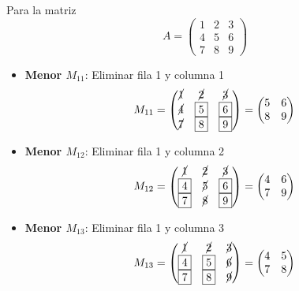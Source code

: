 \begin{example}
Para la matriz 
\[
A = \begin{pmatrix}
1 & 2 & 3 \\
4 & 5 & 6 \\
7 & 8 & 9
\end{pmatrix}
\]

\begin{itemize}
\item \textbf{Menor $M_{11}$}: Eliminar fila 1 y columna 1
\[
M_{11} = \begin{pmatrix}
\cancel{1} & \cancel{2} & \cancel{3} \\
\cancel{4} & \boxed{5} & \boxed{6} \\
\cancel{7} & \boxed{8} & \boxed{9}
\end{pmatrix}
= \begin{pmatrix} 5 & 6 \\ 8 & 9 \end{pmatrix}
\]

\item \textbf{Menor $M_{12}$}: Eliminar fila 1 y columna 2
\[
M_{12} = \begin{pmatrix}
\cancel{1} & \cancel{2} & \cancel{3} \\
\boxed{4} & \cancel{5} & \boxed{6} \\
\boxed{7} & \cancel{8} & \boxed{9}
\end{pmatrix}
= \begin{pmatrix} 4 & 6 \\ 7 & 9 \end{pmatrix}
\]

\item \textbf{Menor $M_{13}$}: Eliminar fila 1 y columna 3
\[
M_{13} = \begin{pmatrix}
\cancel{1} & \cancel{2} & \cancel{3} \\
\boxed{4} & \boxed{5} & \cancel{6} \\
\boxed{7} & \boxed{8} & \cancel{9}
\end{pmatrix}
= \begin{pmatrix} 4 & 5 \\ 7 & 8 \end{pmatrix}
\]
\end{itemize}
\end{example}

